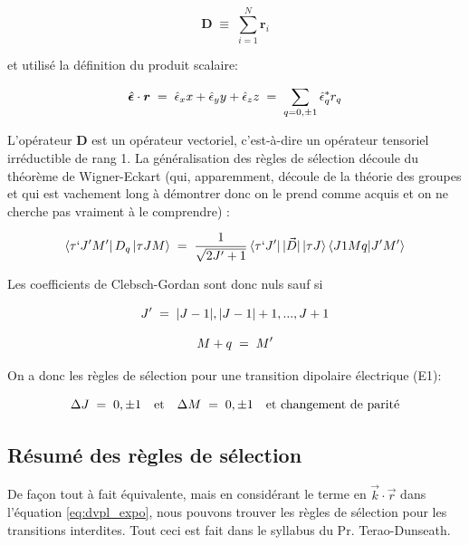 \[
    \bm{D} \;\equiv\; \sum_{i=1}^N \bm{r}_i 
\]

et utilisé la définition du produit scalaire:

\begin{equation}
    \hat{\bm{\epsilon}}\cdot \bm{r} \; = \; \hat{\epsilon}_xx + \hat{\epsilon}_yy + \hat{\epsilon}_zz \; = \; \sum_{q=0,\pm 1}  \hat{\epsilon}_q^* r_q
\end{equation}

L'opérateur $\bm{D}$ est un opérateur vectoriel, c'est-à-dire un opérateur tensoriel irréductible de rang 1. La généralisation des règles de sélection découle du théorème de Wigner-Eckart (qui, apparemment, découle de la théorie des groupes et qui est vachement long à démontrer donc on le prend comme acquis et on ne cherche pas vraiment à le comprendre) :

\begin{equation}
    \bra{\tau ` J'M'}D_q\ket{\tau JM}\; = \; \dfrac{1}{\sqrt{2J'+1}}\bra{\tau `J'}|\vec{D}|\ket{\tau J}\bra{J1Mq}\ket{J'M'}
\end{equation}

Les coefficients de Clebsch-Gordan sont donc nuls sauf si 

\[
    J'\; = \; |J-1|, |J-1|+1, ..., J+1
\]

\[
    M+q\; = \; M'
\]

On a donc les règles de sélection pour une transition dipolaire électrique (E1): 

\begin{equation}
    \Delta J\; = \; 0, \pm1 \quad \text{et} \quad \Delta M\; = \; 0, \pm 1 \quad \text{et        changement de parité}
\end{equation}


\newpage %
\subsection{Résumé des règles de sélection}

De façon tout à fait équivalente, mais en considérant le terme en $\vec{k}\cdot\vec{r}$ dans l'équation \eqref{eq:dvpl_expo}, nous pouvons trouver les règles de sélection pour les transitions interdites. Tout ceci est fait dans le syllabus du Pr. Terao-Dunseath.


